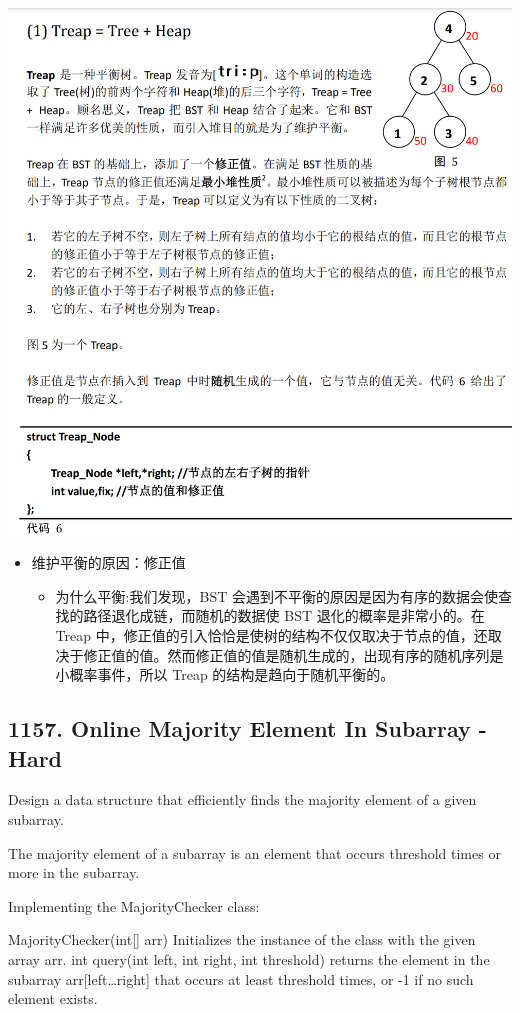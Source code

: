 \documentclass[9pt, b5paaper]{book}
\begin{document}
\begin{enumerate}
\includegraphics[width=.9\linewidth]{./pic/segmentTree_20230414_145439.png}
\begin{itemize}
\item 维护平衡的原因：修正值 
\begin{itemize}
\item 为什么平衡:我们发现，BST 会遇到不平衡的原因是因为有序的数据会使查找的路径退化成链，而随机的数据使 BST 退化的概率是非常小的。在 Treap 中，修正值的引入恰恰是使树的结构不仅仅取决于节点的值，还取决于修正值的值。然而修正值的值是随机生成的，出现有序的随机序列是小概率事件，所以 Treap 的结构是趋向于随机平衡的。
\end{itemize}
\end{itemize}
\end{enumerate}

\subsection{1157. Online Majority Element In Subarray - Hard}
\label{sec-1-1-2}
Design a data structure that efficiently finds the majority element of a given subarray.

The majority element of a subarray is an element that occurs threshold times or more in the subarray.

Implementing the MajorityChecker class:

MajorityChecker(int[] arr) Initializes the instance of the class with the given array arr.
int query(int left, int right, int threshold) returns the element in the subarray arr[left\ldots{}right] that occurs at least threshold times, or -1 if no such element exists.
\end{document}
